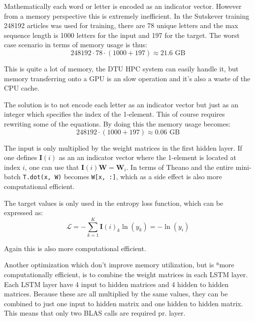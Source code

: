 Mathematically each word or letter is encoded as an indicator vector. However from a memory perspective this is extremely inefficient. In the Sutskever training 248192 articles was used for training, there are 78 unique letters and the max sequence length is 1000 letters for the input and 197 for the target. The worst case scenario in terms of memory usage is thus:
\begin{equation}
248192 \cdot 78 \cdot (1000 + 197) \approx 21.6 \text{ GB}
\end{equation}

This is quite a lot of memory, the DTU HPC system can easily handle it, but memory transferring onto a GPU is an slow operation and it's also a waste of the CPU cache.

The solution is to not encode each letter as an indicator vector but just as an integer which specifies the index of the 1-element. This of course requires rewriting some of the equations. By doing this the memory usage becomes:
\begin{equation}
248192 \cdot (1000 + 197) \approx 0.06 \text{ GB}
\end{equation}

The input is only multiplied by the weight matrices in the first hidden layer. If one defines $\mathbf{I}(i)$ as an an indicator vector where the 1-element is located at index $i$, one can use that $\mathbf{I}(i) \mathbf{W} = \mathbf{W}_{i}$. In terms of Theano and the entire mini-batch \texttt{T.dot(x, W)} becomes \texttt{W[x, :]}, which as a side effect is also more computational efficient.

The target values is only used in the entropy loss function, which can be expressed as:
\begin{equation}
\mathcal{L} = - \sum_{k=1}^K \mathbf{I}(i)_k \ln(y_k) = - \ln(y_i)
\end{equation}

Again this is also more computational efficient.

Another optimization which don't improve memory utilization, but is ªmore computationally efficient, is to combine the weight matrices in each LSTM layer. Each LSTM layer have 4 input to hidden matrices and 4 hidden to hidden matrices. Because these are all multiplied by the same values, they can be combined to just one input to hidden matrix and one hidden to hidden matrix. This means that only two BLAS calls are required pr. layer.
